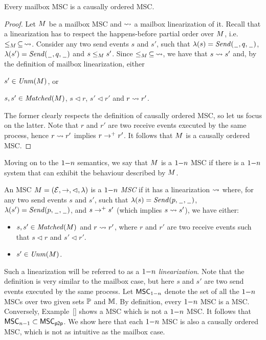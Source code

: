 \begin{proposition}%
	Every mailbox MSC is a causally ordered MSC.
\end{proposition}
\begin{proof}
Let $M$ be a mailbox MSC and $\rightsquigarrow$ a mailbox linearization of it. Recall that a linearization has to respect the happens-before partial order over $M$, i.e. $\le_M \,\subseteq\, \rightsquigarrow$. Consider any two send events $s$ and $s'$, such that $\lambda(s)={\mathit{Send}(\hspace{0.1em}\underline{\hspace{0.5em}}\hspace{0.1em},q,\hspace{0.1em}\underline{\hspace{0.5em}}\hspace{0.1em})}$, $\lambda(s')={\mathit{Send}(\hspace{0.1em}\underline{\hspace{0.5em}}\hspace{0.1em},q,\hspace{0.1em}\underline{\hspace{0.5em}}\hspace{0.1em})}$ and $s \le_M s'$. Since $\le_M \,\subseteq\, \rightsquigarrow$, we have that $s \rightsquigarrow s'$ and, by the definition of mailbox linearization, either
\begin{enumerate*}[label={(\roman*)}]
	\item $s' \in \mathit{Unm}(M)$, or 
	\item $s,s' \in \mathit{Matched}(M)$, $s \lhd r$, $s' \lhd r'$ and $r \rightsquigarrow r'$. 
\end{enumerate*}
The former clearly respects the definition of causally ordered MSC, so let us focus on the latter. Note that $r$ and $r'$ are two receive events executed by the same process, hence $r \rightsquigarrow r'$ implies $r \to^+ r'$. It follows that $M$ is a causally ordered MSC.
\end{proof}

\medskip

Moving on to the $1\mathsf{-}n$ semantics, we say that $M$ is a $1\mathsf{-}n$ MSC if there is a $1\mathsf{-}n$ system that can exhibit the behaviour described by $M$. 

\begin{definition}%
An MSC $M = (\mathcal{E},\to,\lhd,\lambda)$ is a \emph{$1\mathsf{-}n$ MSC} if it has a linearization $\rightsquigarrow$ where, for any two send events $s$ and $s'$, such that $\lambda(s)={\mathit{Send}(p,\hspace{0.1em}\underline{\hspace{0.5em}}\hspace{0.1em},\hspace{0.1em}\underline{\hspace{0.5em}}\hspace{0.1em})}$, $\lambda(s')={\mathit{Send}(p,\hspace{0.1em}\underline{\hspace{0.5em}}\hspace{0.1em},\hspace{0.1em}\underline{\hspace{0.5em}}\hspace{0.1em})}$, and $s \to^+ s'$ (which implies $s \rightsquigarrow s'$), we have either:
\begin{itemize}\itemsep=0.5ex
	\item $s,s' \in \mathit{Matched}(M)$ and $r \rightsquigarrow r'$, where $r$ and $r'$ are two receive events such that $s \lhd r$ and $s' \lhd r'$.
	\item $s' \in \mathit{Unm}(M)$.
\end{itemize}
\end{definition}

Such a linearization will be referred to as a \emph{$1\mathsf{-}n$ linearization}. Note that the definition is very similar to the mailbox case, but here $s$ and $s'$ are two send events executed by the same process. Let $\mathsf{MSC}_{1\mathsf{-}n}$ denote the set of all the $1\mathsf{-}n$ MSCs over two given sets $\mathbb{P}$ and $\mathbb{M}$. By definition, every $1\mathsf{-}n$ MSC is a \pp MSC. Conversely, Example~\ref{} shows a \pp MSC which is not a $1\mathsf{-}n$ MSC. It follows that $\mathsf{MSC}_{n\mathsf{-}1} \subset \mathsf{MSC}_{\mathsf{p2p}}$. We show here that each $1\mathsf{-}n$ MSC is also a causally ordered MSC, which is not as intuitive as the mailbox case.

